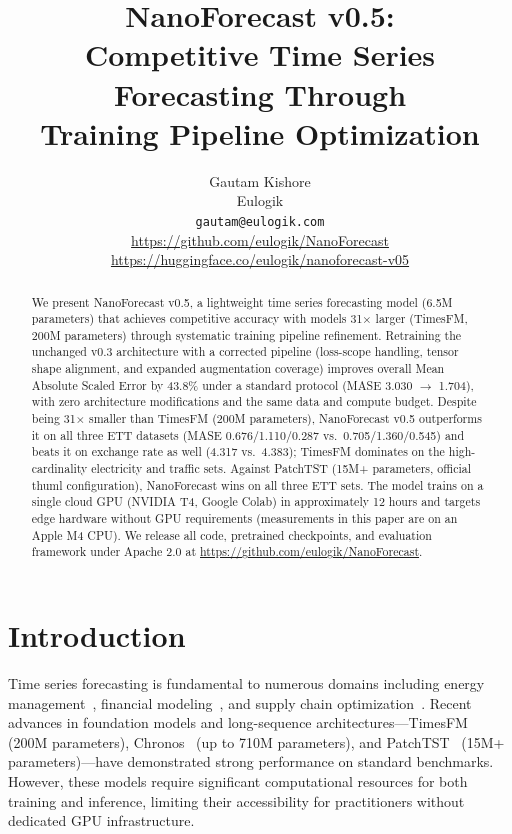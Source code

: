 \documentclass[11pt]{article}
\title{NanoForecast v0.5:\\Competitive Time Series Forecasting Through\\Training Pipeline Optimization}
\author{Gautam Kishore \\
Eulogik \\
\texttt{gautam@eulogik.com} \\
\url{https://github.com/eulogik/NanoForecast} \\
\url{https://huggingface.co/eulogik/nanoforecast-v05}
}
\begin{document}
\maketitle

\begin{abstract}
We present NanoForecast v0.5, a lightweight time series forecasting model (6.5M parameters) that achieves competitive accuracy with models 31$\times$ larger (TimesFM, 200M parameters) through systematic training pipeline refinement. Retraining the unchanged v0.3 architecture with a corrected pipeline (loss-scope handling, tensor shape alignment, and expanded augmentation coverage) improves overall Mean Absolute Scaled Error by 43.8\% under a standard protocol (MASE 3.030 $\to$ 1.704), with zero architecture modifications and the same data and compute budget. Despite being 31$\times$ smaller than TimesFM (200M parameters), NanoForecast v0.5 outperforms it on all three ETT datasets (MASE 0.676/1.110/0.287 vs.\ 0.705/1.360/0.545) and beats it on exchange rate as well (4.317 vs.\ 4.383); TimesFM dominates on the high-cardinality electricity and traffic sets. Against PatchTST (15M+ parameters, official thuml configuration), NanoForecast wins on all three ETT sets. The model trains on a single cloud GPU (NVIDIA T4, Google Colab) in approximately 12 hours and targets edge hardware without GPU requirements (measurements in this paper are on an Apple M4 CPU). We release all code, pretrained checkpoints, and evaluation framework under Apache 2.0 at \url{https://github.com/eulogik/NanoForecast}.
\end{abstract}

\section{Introduction}
\label{sec:intro}

Time series forecasting is fundamental to numerous domains including energy management~\cite{ett}, financial modeling~\cite{finance_review}, and supply chain optimization~\cite{supply_chain}. Recent advances in foundation models and long-sequence architectures---TimesFM~\cite{timesfm} (200M parameters), Chronos~\cite{chronos} (up to 710M parameters), and PatchTST~\cite{patchtst} (15M+ parameters)---have demonstrated strong performance on standard benchmarks. However, these models require significant computational resources for both training and inference, limiting their accessibility for practitioners without dedicated GPU infrastructure.
\end{document}

